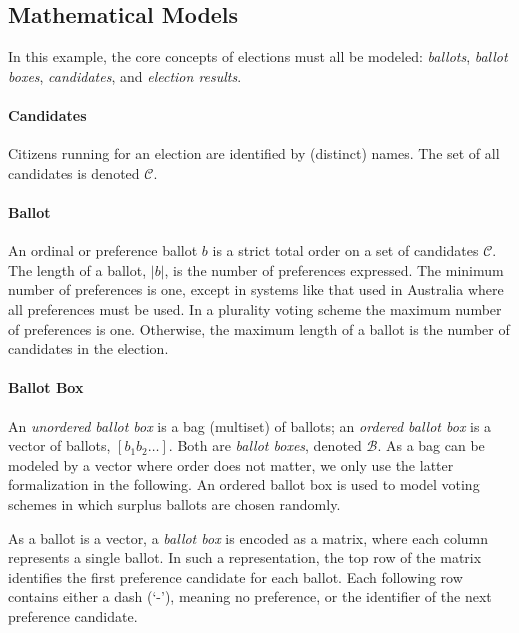 \documentclass[runningheads,a4paper]{llncs}
\newcommand{\ballots}{\ensuremath{\mathcal{B}}\xspace}
\newcommand{\candidates}{\ensuremath{\mathcal{C}}\xspace}
\begin{document}
\subsection{Mathematical Models}
\label{subsec:mathematical-models}

In this example, the core concepts of elections must all be modeled:
\emph{ballots}, \emph{ballot boxes}, \emph{candidates}, and
\emph{election results}.

\paragraph*{Candidates}

Citizens running for an election are identified by (distinct) names.
The set of all candidates is denoted \candidates.

\paragraph*{Ballot}

An ordinal or preference ballot $b$ is a strict total order on a set
of candidates \candidates.  The length of a ballot, $|b|$, is the
number of preferences expressed.  The minimum number of preferences is
one, except in systems like that used in Australia where all
preferences must be used.  In a plurality voting scheme the maximum
number of preferences is one.  Otherwise, the maximum length of a
ballot is the number of candidates in the election.

\paragraph*{Ballot Box}

An \emph{unordered ballot box} is a bag (multiset) of ballots; an
\emph{ordered ballot box} is a vector of ballots, $[b_1b_2\ldots]$.
Both are \emph{ballot boxes}, denoted \ballots.  As a bag can be
modeled by a vector where order does not matter, we only use the
latter formalization in the following.  An ordered ballot box is used
to model voting schemes in which surplus ballots are chosen randomly.

As a ballot is a vector, a \emph{ballot box} is encoded as a matrix,
where each column represents a single ballot.  In such a
representation, the top row of the matrix identifies the first
preference candidate for each ballot.  Each following row contains
either a dash (`-'), meaning no preference, or the identifier of the
next preference candidate.
\end{document}
